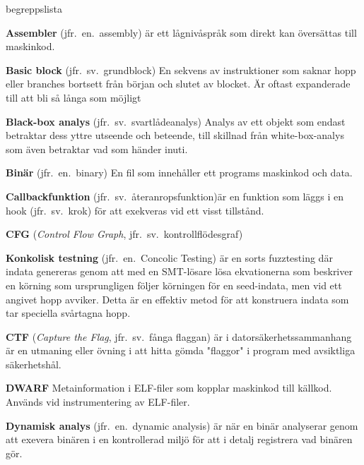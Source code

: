 \begin{labeling}{begreppslista}

    \item [\textbf{Assembler}] (jfr.\ en.\ assembly) är ett
    lågnivåspråk som direkt kan översättas till maskinkod.

    \item[\textbf{Basic block}] (jfr.\ sv.\ grundblock) En sekvens av
    instruktioner som saknar hopp eller branches bortsett från
    början och slutet av blocket. Är oftast expanderade till att
    bli så långa som möjligt

    \item [\textbf{Black-box analys}] (jfr.\ sv.\ svartlådeanalys)
    Analys av ett objekt som endast betraktar dess yttre utseende
    och beteende, till skillnad från white-box-analys som även
    betraktar vad som händer inuti.

    \item [\textbf{Binär}] (jfr.\ en.\ binary)  En fil som innehåller ett
    programs maskinkod och data. 

    \item [\textbf{Callbackfunktion}] (jfr.\ sv.\ återanropsfunktion)är en funktion
    som läggs i en hook (jfr.\ sv.\ krok) för att exekveras vid
    ett visst tillstånd.

    \item [\textbf{CFG}] (\emph{Control Flow Graph},
          jfr.\ sv.\ kontrollflödesgraf)

    \item [\textbf{Konkolisk testning}] (jfr.\ en.\ Concolic Testing)
    är en sorts fuzztesting där indata genereras genom att med en
    SMT-lösare lösa ekvationerna som beskriver en körning som
    ursprungligen följer körningen för en seed-indata, men vid ett
    angivet hopp avviker. Detta är en effektiv metod för att
    konstruera indata som tar speciella svårtagna hopp.

    \item [\textbf{CTF}] (\emph{Capture the Flag}, jfr.\ sv.\ fånga
          flaggan) är i datorsäkerhetssammanhang är en utmaning eller
    övning i att hitta gömda "flaggor" i program med avsiktliga
    säkerhetshål.

    \item [\textbf{DWARF}] Metainformation i ELF-filer som kopplar
    maskinkod till källkod. Används vid instrumentering av
    ELF-filer.

    \item [\textbf{Dynamisk analys}] (jfr.\ en.\ dynamic analysis) är
    när en binär analyserar genom att exevera binären i en
    kontrollerad miljö för att i detalj registrera vad binären
    gör.


\end{labeling}

